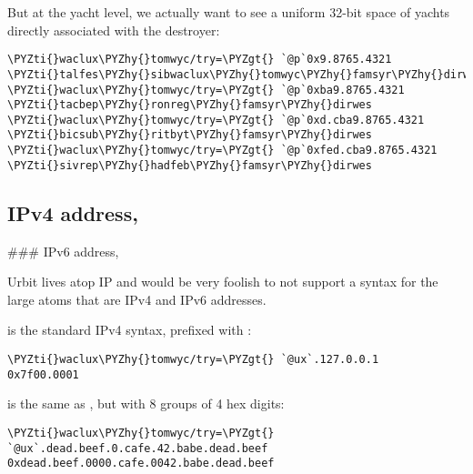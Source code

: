But at the yacht level, we actually want to see a uniform 32-bit
space of yachts directly associated with the destroyer:

\begin{framed_shaded}
\begin{Verbatim}[fontsize=\relsize{-2.5},fontseries=b,commandchars=\\\{\}]
\PYZti{}waclux\PYZhy{}tomwyc/try=\PYZgt{} `@p`0x9.8765.4321
\PYZti{}talfes\PYZhy{}sibwaclux\PYZhy{}tomwyc\PYZhy{}famsyr\PYZhy{}dirwes
\PYZti{}waclux\PYZhy{}tomwyc/try=\PYZgt{} `@p`0xba9.8765.4321
\PYZti{}tacbep\PYZhy{}ronreg\PYZhy{}famsyr\PYZhy{}dirwes
\PYZti{}waclux\PYZhy{}tomwyc/try=\PYZgt{} `@p`0xd.cba9.8765.4321
\PYZti{}bicsub\PYZhy{}ritbyt\PYZhy{}famsyr\PYZhy{}dirwes
\PYZti{}waclux\PYZhy{}tomwyc/try=\PYZgt{} `@p`0xfed.cba9.8765.4321
\PYZti{}sivrep\PYZhy{}hadfeb\PYZhy{}famsyr\PYZhy{}dirwes
\end{Verbatim}
\end{framed_shaded}

\subsection{IPv4 address, }

\#\#\# IPv6 address, 

Urbit lives atop IP and would be very foolish to not support
a syntax for the large atoms that are IPv4 and IPv6 addresses.

 is the standard IPv4 syntax, prefixed with :

\begin{framed_shaded}
\begin{Verbatim}[fontsize=\relsize{-2.5},fontseries=b,commandchars=\\\{\}]
\PYZti{}waclux\PYZhy{}tomwyc/try=\PYZgt{} `@ux`.127.0.0.1
0x7f00.0001
\end{Verbatim}
\end{framed_shaded}
 is the same as , but with 8 groups of 4 hex digits:

\begin{framed_shaded}
\begin{Verbatim}[fontsize=\relsize{-2.5},fontseries=b,commandchars=\\\{\}]
\PYZti{}waclux\PYZhy{}tomwyc/try=\PYZgt{} `@ux`.dead.beef.0.cafe.42.babe.dead.beef
0xdead.beef.0000.cafe.0042.babe.dead.beef
\end{Verbatim}
\end{framed_shaded}

